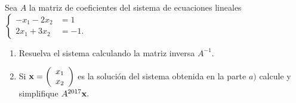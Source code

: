 \begin{prob}
Sea $A$ la matriz de coeficientes del sistema de ecuaciones lineales $\left\lbrace \begin{array}{cc}
-x_1-2x_2&=1\\ 
2x_1+3x_2&=-1. 
\end{array}\right.$

\begin{enumerate}[$a)$]
\item Resuelva el sistema calculando la matriz inversa $A^{-1}.$
\item Si ${\bf x}=\left( \begin{array}{c} x_1 \\ x_2 \end{array} \right)$ es la solución del sistema obtenida en la parte $a)$ calcule y simplifique $A^{2017}{\bf x}.$
\end{enumerate}
\end{prob}


